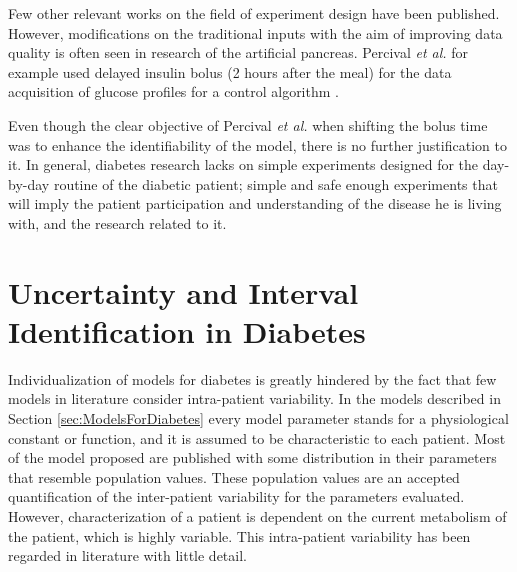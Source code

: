 Few other relevant works on the field of experiment design have been published. However, modifications on the traditional inputs with the aim of improving data quality is often seen in research of the artificial pancreas. Percival \textit{et al.} for example used delayed insulin bolus (2 hours after the meal) for the data acquisition of glucose profiles for a control algorithm \cite{percival}. %

Even though the clear objective of Percival \textit{et al.} when shifting the bolus time was to enhance the identifiability of the model, there is no further justification to it. In general, diabetes research lacks on simple experiments designed for the day-by-day routine of the diabetic patient; simple and safe enough experiments that will imply the patient participation and understanding of the disease he is living with, and the research related to it.

\section{Uncertainty and Interval Identification in Diabetes}
\label{sec:IntervalIdentificationInDiabetes}

Individualization of models for diabetes is greatly hindered by the fact that few models in literature consider intra-patient variability. In the models described in Section \ref{sec:ModelsForDiabetes} every model parameter stands for a physiological constant or function, and it is assumed to be characteristic to each patient. Most of the model proposed are published with some distribution in their parameters that resemble population values. These population values are an accepted quantification of the inter-patient variability for the parameters evaluated. However, characterization of a patient is dependent on the current metabolism of the patient, which is highly variable. This intra-patient variability has been regarded in literature with little detail.

